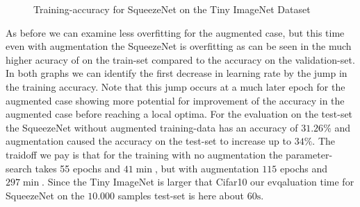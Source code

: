 \documentclass[11pt]{article}
\begin{document}
\begin{figure}
\centering
{}
  \hfill
  \hfill
\caption{Training-accuracy for SqueezeNet on the Tiny ImageNet Dataset}
\label{rescnn::5}
\end{figure}

As before we can examine less overfitting for the augmented case, but this time even with augmentation the SqueezeNet is overfitting as can be seen in the much higher acuracy of on the train-set compared to the accuracy on the validation-set. In both graphs we can identify the first decrease in learning rate by the jump in the training accuracy. Note that this jump occurs at a much later epoch for the augmented case showing more potential for improvement of the accuracy in the augmented case before reaching a local optima. For the evaluation on the test-set the SqueezeNet without augmented training-data has an accuracy of $31.26\%$ and augmentation caused the accuracy on the test-set to increase up to $34\%$. The traidoff we pay is that for the training with no augmentation the parameter-search takes 55 epochs and $41 \min$, but with augmentation $115$ epochs and $297 \min$. Since the Tiny ImageNet is larger that Cifar10 our evqaluation time for SqueezeNet on the $10.000$ samples test-set is here about $60\text{s}$.
\end{document}
